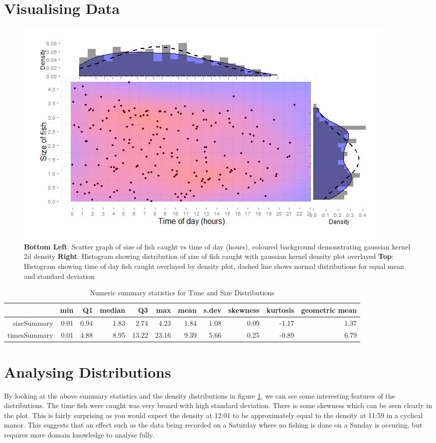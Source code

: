 \documentclass{article}
\begin{document}
\section{Visualising Data}
\begin{figure}[h]
\includegraphics[width=\linewidth]{figure1.jpg}
\caption{\textbf{Bottom Left}: Scatter graph of size of fish caught vs time of day (hours), coloured background demonstrating gaussian kernel 2d density \textbf{Right}: Histogram showing distribution of size of fish caught with gaussian kernel density plot overlayed \textbf{Top}: Histogram showing time of day fish caught overlayed by density plot, dashed line shows normal distributions for equal mean and standard deviation}
\label{fig:1}
\end{figure}
\begin{table}[ht]
\centering
\begin{tabular}{rrrrrrrrrrr}
  \hline
 & min & Q1 & median & Q3 & max & mean & s.dev & skewness & kurtosis & geometric mean \\ 
  \hline
sizeSummary & 0.01 & 0.94 & 1.83 & 2.74 & 4.23 & 1.84 & 1.08 & 0.09 & -1.17 & 1.37 \\ 
  timesSummary & 0.01 & 4.88 & 8.95 & 13.22 & 23.16 & 9.39 & 5.66 & 0.25 & -0.89 & 6.79 \\ 
   \hline
\end{tabular}
\caption{Numeric summary statistics for Time and Size Distributions} 
\end{table}
\section{Analysing Distributions}

By looking at the above summary statistics and the density distributions in figure \ref{fig:1}, we can see some interesting features of the distributions. The time fish were caught was very broard with high standard deviation. There is some skewness which can be seen clearly in the plot. This is fairly surprising as you would expect the density at 12:01 to be approximately equal to the density at 11:59 in a cyclical manor. This suggests that an effect such as the data being recorded on a Saturday where no fishing is done on a Sunday is occuring, but requires more domain knowledge to analyse fully.
\end{document}
